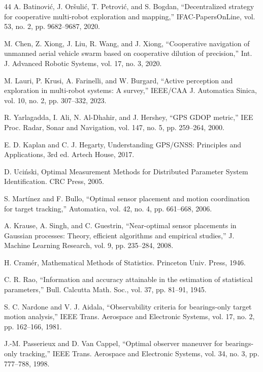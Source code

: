 \documentclass[journal]{IEEEtran}
\begin{document}
\begin{thebibliography}{44}
 A. Batinović, J. Oršulić, T. Petrović, and S. Bogdan, ``Decentralized strategy for cooperative multi-robot exploration and mapping,'' IFAC-PapersOnLine, vol. 53, no. 2, pp. 9682--9687, 2020.

 M. Chen, Z. Xiong, J. Liu, R. Wang, and J. Xiong, ``Cooperative navigation of unmanned aerial vehicle swarm based on cooperative dilution of precision,'' Int. J. Advanced Robotic Systems, vol. 17, no. 3, 2020.

 M. Lauri, P. Krusi, A. Farinelli, and W. Burgard, ``Active perception and exploration in multi-robot systems: A survey,'' IEEE/CAA J. Automatica Sinica, vol. 10, no. 2, pp. 307--332, 2023.

 R. Yarlagadda, I. Ali, N. Al-Dhahir, and J. Hershey, ``GPS GDOP metric,'' IEE Proc. Radar, Sonar and Navigation, vol. 147, no. 5, pp. 259--264, 2000.

 E. D. Kaplan and C. J. Hegarty, Understanding GPS/GNSS: Principles and Applications, 3rd ed. Artech House, 2017.

 D. Uciński, Optimal Measurement Methods for Distributed Parameter System Identification. CRC Press, 2005.

 S. Martínez and F. Bullo, ``Optimal sensor placement and motion coordination for target tracking,'' Automatica, vol. 42, no. 4, pp. 661--668, 2006.

 A. Krause, A. Singh, and C. Guestrin, ``Near-optimal sensor placements in Gaussian processes: Theory, efficient algorithms and empirical studies,'' J. Machine Learning Research, vol. 9, pp. 235--284, 2008.

 H. Cramér, Mathematical Methods of Statistics. Princeton Univ. Press, 1946.

 C. R. Rao, ``Information and accuracy attainable in the estimation of statistical parameters,'' Bull. Calcutta Math. Soc., vol. 37, pp. 81--91, 1945.

 S. C. Nardone and V. J. Aidala, ``Observability criteria for bearings-only target motion analysis,'' IEEE Trans. Aerospace and Electronic Systems, vol. 17, no. 2, pp. 162--166, 1981.

 J.-M. Passerieux and D. Van Cappel, ``Optimal observer maneuver for bearings-only tracking,'' IEEE Trans. Aerospace and Electronic Systems, vol. 34, no. 3, pp. 777--788, 1998.


\end{thebibliography}
\end{document}
